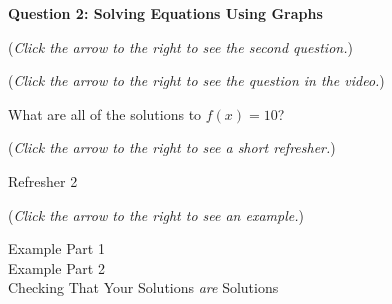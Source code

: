 \documentclass{ximera}
\begin{document}
\textbf{Question 2: Solving Equations Using Graphs}
\begin{question}
\begin{flushright}
{\color{blue}(\emph{Click the arrow to the right to see the second question.})}
\end{flushright}
\begin{center}
\begin{expandable}
{\color{blue}(\emph{Click the arrow to the right to see the question
in the video.})}
\begin{expandable}

What are all of the solutions to $f(x)=10$?

\begin{multipleChoice}
\end{multipleChoice}
\begin{flushright}
{\color{blue}(\emph{Click the arrow to the right to see a short refresher.})}
\end{flushright}
\begin{expandable}
Refresher 2
\end{expandable}
\begin{flushright}
{\color{blue}(\emph{Click the arrow to the right to see an example.})}
\end{flushright}
\begin{expandable}
Example Part 1
\\

Example Part 2
\\

Checking That Your Solutions \emph{are} Solutions
\end{expandable}
\end{expandable}
\end{expandable}
\end{center}
\end{question}
\end{document}
